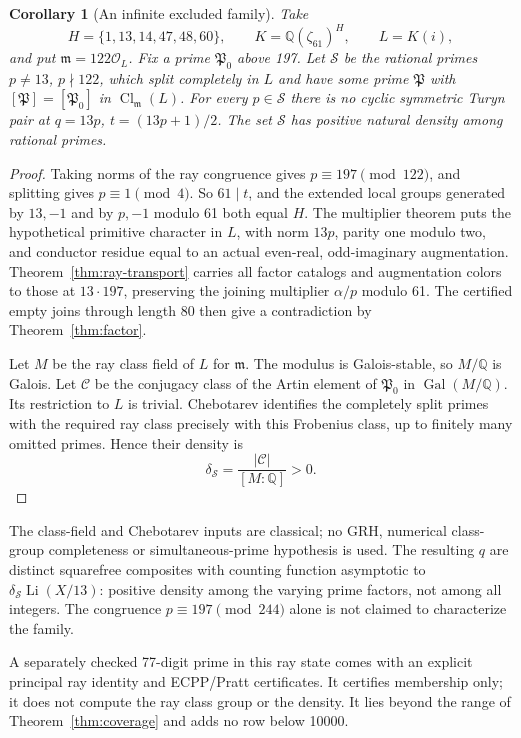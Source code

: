 \documentclass[11pt]{article}
\newtheorem{corollary}[theorem]{Corollary}
\theoremstyle{definition}
\theoremstyle{remark}
\begin{document}
\begin{corollary}[An infinite excluded family]\label{cor:ray-family}
Take
\[
 H=\{1,13,14,47,48,60\},\qquad K=\mathbb Q(\zeta_{61})^H,
 \qquad L=K(i),
\]
and put $\mathfrak m=122\mathcal O_L$. Fix a prime $\mathfrak P_0$ above 197.
Let $\mathcal S$ be the rational primes $p\ne13$, $p\nmid122$, which
split completely in $L$ and have some prime $\mathfrak P$ with
$[\mathfrak P]=[\mathfrak P_0]$ in $\operatorname{Cl}_{\mathfrak m}(L)$.
For every $p\in\mathcal S$ there is no cyclic symmetric Turyn pair at
$q=13p$, $t=(13p+1)/2$. The set $\mathcal S$ has positive natural density
among rational primes.
\end{corollary}
\begin{proof}
Taking norms of the ray congruence gives $p\equiv197\pmod{122}$, and
splitting gives $p\equiv1\pmod4$. So $61\mid t$, and the extended local
groups generated by $13,-1$ and by $p,-1$ modulo 61 both equal $H$.
The multiplier theorem puts the hypothetical primitive character in $L$,
with norm $13p$, parity one modulo two, and conductor residue equal to an
actual even-real, odd-imaginary augmentation.
Theorem~\ref{thm:ray-transport} carries all factor catalogs and augmentation
colors to those at $13\cdot197$, preserving the joining multiplier
$\alpha/p$ modulo 61. The certified empty joins through length 80 then
give a contradiction by Theorem~\ref{thm:factor}.

Let $M$ be the ray class field of $L$ for $\mathfrak m$. The modulus is
Galois-stable, so $M/\mathbb Q$ is Galois. Let $\mathcal C$ be the
conjugacy class of the Artin element of $\mathfrak P_0$ in
$\operatorname{Gal}(M/\mathbb Q)$. Its restriction to $L$ is trivial.
Chebotarev \cite[Theorems~28.6 and~28.9]{Sutherland21} identifies the completely split primes with the required ray
class precisely with this Frobenius class, up to finitely many omitted
primes. Hence their density is
\[
 \delta_{\mathcal S}=\frac{|\mathcal C|}{[M:\mathbb Q]}>0.
\]
\end{proof}
The class-field and Chebotarev inputs are classical; no GRH, numerical
class-group completeness or simultaneous-prime hypothesis is used. The
resulting $q$ are distinct squarefree composites with counting function
asymptotic to $\delta_{\mathcal S}\operatorname{Li}(X/13)$: positive
density among the varying prime factors, not among all integers. The
congruence $p\equiv197\pmod{244}$ alone is not claimed to characterize the
family.

A separately checked 77-digit prime in this ray state comes with an
explicit principal ray identity and ECPP/Pratt certificates. It certifies
membership only; it does not compute the ray class group or the density.
It lies beyond the range of Theorem~\ref{thm:coverage} and adds no row
below 10000.
\end{document}
